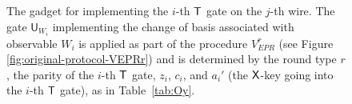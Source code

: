 \documentclass[11pt,letter]{article}
\theoremstyle{remark}
\theoremstyle{definition}
\newcommand{\ket}[1]{|#1\rangle}
\begin{document}
\begin{figure}[H]
\begin{tikzpicture}
\end{tikzpicture}
\caption{The gadget for implementing the $i$-th $\sf T$ gate on the $j$-th wire. The gate $\mathsf{U}_{W_i}$ implementing the change of basis associated with observable $W_i$ is applied as part of the procedure $V_{EPR}^r$ (see Figure \ref{fig:original-protocol-VEPRr}) and is determined by the round type $r$, the parity of the $i$-th $\sf T$ gate, $z_i$, $c_i$, and $a_i'$ (the $\sf X$-key going into the $i$-th $\sf T$ gate), as in Table~\ref{tab:Oy}. %
}\label{fig:tgadget-EPR}
\end{figure}
\end{document}
